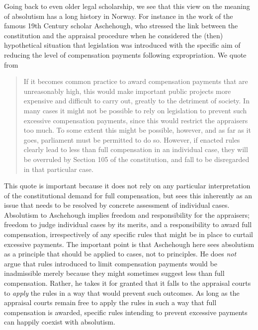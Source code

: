 \documentclass[10pt]{article} %
\begin{document}
Going back to even older legal scholarship, we see that this view on the meaning of absolutism has a long history in Norway. For instance in the work of the famous 19th Century scholar Aschehough, who stressed the link between the constitution and the appraisal procedure when he considered the (then) hypothetical situation that legislation was introduced with the specific aim of reducing the level of compensation payments following expropriation. We quote from \cite[p.48]{asch} 

\begin{quote}
If it becomes common practice to award compensation payments that are unreasonably high, this would make important public projects more expensive and difficult to carry out, greatly to the detriment of society. In many cases it might not be possible to rely on legislation to prevent such excessive compensation payments, since this would restrict the appraisers too much. To some extent this might be possible, however, and as far as it goes, parliament must be permitted to do so. However, if enacted rules clearly lead to less than full compensation in an individual case, they will be overruled by Section 105 of the constitution, and fall to be disregarded in that particular case.
\end{quote}

This quote is important because it does not rely on any particular interpretation of the constitutional demand for full compensation, but sees this inherently as an issue that needs to be resolved by concrete assessment of individual cases. Absolutism to Aschehough implies freedom and responsibility for the appraisers; freedom to judge individual cases by its merits, and a responsibility to award full compensation, irrespectively of any specific rules that might be in place to curtail excessive payments. The important point is that Aschehough here sees absolutism as a principle that should be applied to cases, not to principles. He does \emph{not} argue that rules introduced to limit compensation payments would be inadmissible merely because they might sometimes suggest less than full compensation. Rather, he takes it for granted that it falls to the appraisal courts to \emph{apply} the rules in a way that would prevent such outcomes. As long as the appraisal courts remain free to apply the rules in such a way that full compensation is awarded, specific rules intending to prevent excessive payments can happily coexist with absolutism.
\end{document}
